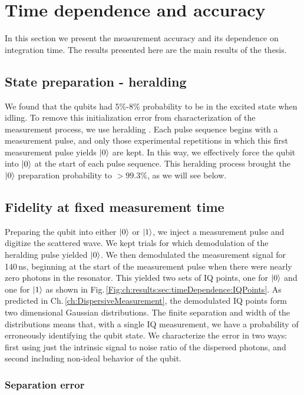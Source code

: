 \section{Time dependence and accuracy} \label{sec:ch:results:timeDependence}

In this section we present the measurement accuracy and its dependence on integration time.
The results presented here are the main results of the thesis.

\subsection{State preparation - heralding}

We found that the qubits had 5\%-8\% probability to be in the excited state when idling.
To remove this initialization error from characterization of the measurement process, we use heralding \cite{Johnson:heralding2012}.
Each pulse sequence begins with a measurement pulse, and only those experimental repetitions in which this first measurement pulse yields $|0\rangle$ are kept.
In this way, we effectively force the qubit into $|0\rangle$ at the start of each pulse sequence.
This heralding process brought the $|0\rangle$ preparation probability to $>99.3\%$, as we will see below.

\subsection{Fidelity at fixed measurement time}

Preparing the qubit into either $|0\rangle$ or $|1\rangle$, we inject a measurement pulse and digitize the scattered wave.
We kept trials for which demodulation of the heralding pulse yielded $|0\rangle$.
We then demodulated the measurement signal for 140\,ns, beginning at the start of the measurement pulse when there were nearly zero photons in the resonator.
This yielded two sets of IQ points, one for $|0\rangle$ and one for $|1\rangle$ as shown in Fig.\,\ref{Fig:ch:results:sec:timeDependence:IQPoints}.
As predicted in Ch.\,\ref{ch:DispersiveMeasurement}, the demodulated IQ points form two dimensional Gaussian distributions.
The finite separation and width of the distributions means that, with a single IQ measurement, we have a probability of erroneously identifying the qubit state.
We characterize the error in two ways: first using just the intrinsic signal to noise ratio of the dispersed photons, and second including non-ideal behavior of the qubit.

\subsubsection{Separation error}

